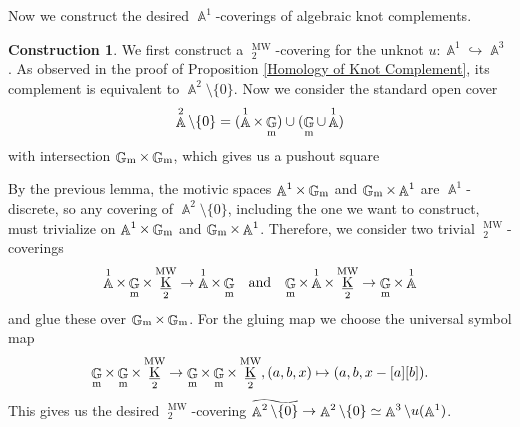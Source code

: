 \documentclass[english]{amsart}
\theoremstyle{definition}
\newtheorem{con}[prop]{Construction}
\newcommand\reallywidetilde[1]{\ThisStyle{%
  \setbox0=\hbox{$\SavedStyle#1$}%
  \stackengine{-.1\LMpt}{$\SavedStyle#1$}{%
    \stretchto{\scaleto{\SavedStyle\mkern.2mu\AC}{.5150\wd0}}{.4\ht0}%
  }{O}{c}{F}{T}{S}%
}}
\DeclareMathOperator{\A}{\mathbb{A}}
\DeclareMathOperator{\G}{\mathbb{G}}
\DeclareMathOperator{\wo}{\hspace{-1pt}\setminus}
\DeclareMathOperator{\KK}{\underline{K}}
\DeclareMathOperator{\MW}{MW}
\begin{document}
Now we construct the desired $\A^1$-coverings of algebraic knot complements.
\begin{con}\label{Construction of Milnor--Witt K_2 coverings}
We first construct a $\KK^{\MW}_2$-covering for the unknot $u \colon \A^1 \hookrightarrow \A^3$. As observed in the proof of Proposition \ref{Homology of Knot Complement}, its complement is equivalent to $\A^2 \setminus \lbrace 0 \rbrace$. Now we consider the standard open cover 
$$\A^2 \setminus \lbrace 0 \rbrace = (\A^1 \times \G_{\rm m}) \cup (\G_{\rm m} \cup \A^1)$$
with intersection $\G_{\rm m} \times \G_{\rm m}$, which gives us a pushout square
\begin{center}
\end{center}
By the previous lemma, the motivic spaces $\A^1 \times \G_{\rm m}$ and $\G_{\rm m} \times \A^1$ are $\A^1$-discrete, so any covering of $\A^2 \setminus \lbrace 0 \rbrace$, including the one we want to construct, must trivialize on $\A^1 \times \G_{\rm m}$ and $\G_{\rm m} \times \A^1$. Therefore, we consider two trivial $\KK^{\MW}_2$-coverings
$$\A^1 \times \G_{\rm m} \times \KK^{\MW}_2 \rightarrow \A^1 \times \G_{\rm m} \hspace{5pt}\text{ and }\hspace{5pt} \G_{\rm m} \times \A^1 \times \KK^{\MW}_2\rightarrow \G_{\rm m} \times \A^1$$
and glue these over $\G_{\rm m} \times \G_{\rm m}$. For the gluing map we choose the universal symbol map
$$\G_{\rm m} \times \G_{\rm m} \times \KK^{\MW}_2 \rightarrow \G_{\rm m} \times \G_{\rm m} \times \KK^{\MW}_2, (a,b,x) \mapsto (a,b,x - [a][b]).$$
This gives us the desired $\KK^{\MW}_2$-covering $\reallywidetilde{\A^2 \setminus \lbrace 0 \rbrace} \rightarrow \A^2 \setminus \lbrace 0 \rbrace \simeq \A^3 \setminus u(\A^1)$.


\end{con}
\end{document}
